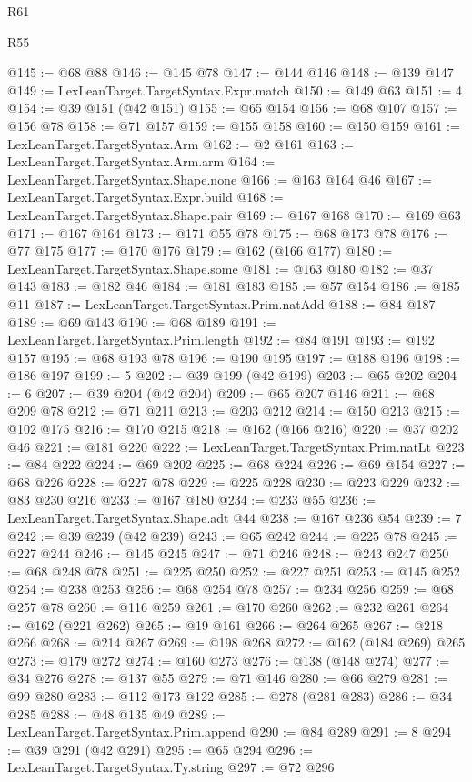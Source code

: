 \begin{lexlean}{R61}
\begin{lexlean}{R55}
\begin{coremodule}
{{{{{{{{{{{{{{{{{{{{{{{{{{{{{{{{{{{{{{{{{{{{{{{{{{{{{{{{{{{{@145 := @68 @88
@146 := @145 @78
@147 := @144 @146
@148 := @139 @147
@149 := LexLeanTarget.TargetSyntax.Expr.match
@150 := @149 @63
@151 := 4
@154 := @39 @151 (@42 @151)
@155 := @65 @154
@156 := @68 @107
@157 := @156 @78
@158 := @71 @157
@159 := @155 @158
@160 := @150 @159
@161 := LexLeanTarget.TargetSyntax.Arm
@162 := @2 @161
@163 := LexLeanTarget.TargetSyntax.Arm.arm
@164 := LexLeanTarget.TargetSyntax.Shape.none
@166 := @163 @164 @46
@167 := LexLeanTarget.TargetSyntax.Expr.build
@168 := LexLeanTarget.TargetSyntax.Shape.pair
@169 := @167 @168
@170 := @169 @63
@171 := @167 @164
@173 := @171 @55 @78
@175 := @68 @173 @78
@176 := @77 @175
@177 := @170 @176
@179 := @162 (@166 @177)
@180 := LexLeanTarget.TargetSyntax.Shape.some
@181 := @163 @180
@182 := @37 @143
@183 := @182 @46
@184 := @181 @183
@185 := @57 @154
@186 := @185 @11
@187 := LexLeanTarget.TargetSyntax.Prim.natAdd
@188 := @84 @187
@189 := @69 @143
@190 := @68 @189
@191 := LexLeanTarget.TargetSyntax.Prim.length
@192 := @84 @191
@193 := @192 @157
@195 := @68 @193 @78
@196 := @190 @195
@197 := @188 @196
@198 := @186 @197
@199 := 5
@202 := @39 @199 (@42 @199)
@203 := @65 @202
@204 := 6
@207 := @39 @204 (@42 @204)
@209 := @65 @207 @146
@211 := @68 @209 @78
@212 := @71 @211
@213 := @203 @212
@214 := @150 @213
@215 := @102 @175
@216 := @170 @215
@218 := @162 (@166 @216)
@220 := @37 @202 @46
@221 := @181 @220
@222 := LexLeanTarget.TargetSyntax.Prim.natLt
@223 := @84 @222
@224 := @69 @202
@225 := @68 @224
@226 := @69 @154
@227 := @68 @226
@228 := @227 @78
@229 := @225 @228
@230 := @223 @229
@232 := @83 @230 @216
@233 := @167 @180
@234 := @233 @55
@236 := LexLeanTarget.TargetSyntax.Shape.adt @44
@238 := @167 @236 @54
@239 := 7
@242 := @39 @239 (@42 @239)
@243 := @65 @242
@244 := @225 @78
@245 := @227 @244
@246 := @145 @245
@247 := @71 @246
@248 := @243 @247
@250 := @68 @248 @78
@251 := @225 @250
@252 := @227 @251
@253 := @145 @252
@254 := @238 @253
@256 := @68 @254 @78
@257 := @234 @256
@259 := @68 @257 @78
@260 := @116 @259
@261 := @170 @260
@262 := @232 @261
@264 := @162 (@221 @262)
@265 := @19 @161
@266 := @264 @265
@267 := @218 @266
@268 := @214 @267
@269 := @198 @268
@272 := @162 (@184 @269) @265
@273 := @179 @272
@274 := @160 @273
@276 := @138 (@148 @274)
@277 := @34 @276
@278 := @137 @55
@279 := @71 @146
@280 := @66 @279
@281 := @99 @280
@283 := @112 @173 @122
@285 := @278 (@281 @283)
@286 := @34 @285
@288 := @48 @135 @49
@289 := LexLeanTarget.TargetSyntax.Prim.append
@290 := @84 @289
@291 := 8
@294 := @39 @291 (@42 @291)
@295 := @65 @294
@296 := LexLeanTarget.TargetSyntax.Ty.string
@297 := @72 @296
}}}}}}}}}}}}}}}}}}}}}}}}}}}}}}}}}}}}}}}}}}}}}}}}}}}}}}}}}}}}
\end{coremodule}
\end{lexlean}
\end{lexlean}
